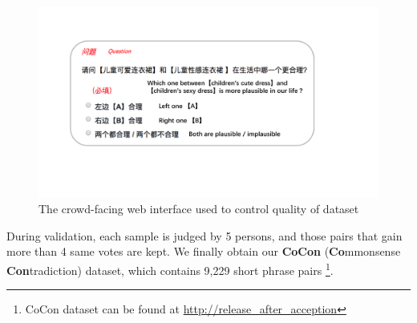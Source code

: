 \begin{figure}
	\centering
	\includegraphics[width=0.95\columnwidth]{images/crowdPage.pdf}
	\caption{The crowd-facing web interface used to control quality of dataset}
	\label{fig:crowd}
\end{figure}

During validation, each sample is judged by 5 persons, and those pairs that gain more than 4 same votes are kept. %
We finally obtain our \textbf{CoCon} (\textbf{Co}mmonsense \textbf{Con}tradiction) dataset, which contains 9,229 short phrase pairs \footnote{CoCon dataset can be found at \url{http://release_after_acception}}.

